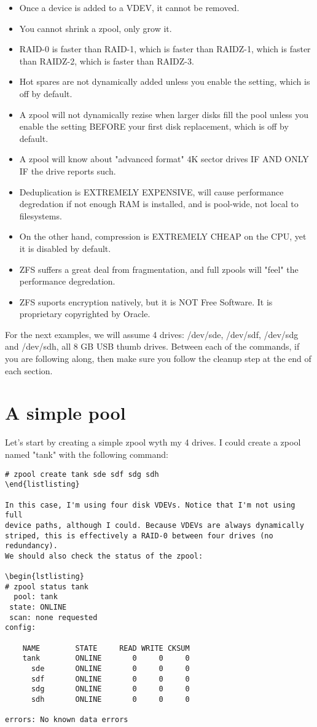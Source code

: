 \documentclass{book}
\begin{document}
\begin{itemize}
\item Once a device is added to a VDEV, it cannot be removed.
\item You cannot shrink a zpool, only grow it.
\item RAID-0 is faster than RAID-1, which is faster than RAIDZ-1, which is
faster than RAIDZ-2, which is faster than RAIDZ-3.
\item Hot spares are not dynamically added unless you enable the setting,
which is off by default.
\item A zpool will not dynamically rezise when larger disks fill the pool
unless you enable the setting BEFORE your first disk replacement, which is
off by default.
\item A zpool will know about "advanced format" 4K sector drives IF AND
ONLY IF the drive reports such.
\item Deduplication is EXTREMELY EXPENSIVE, will cause performance
degredation if not enough RAM is installed, and is pool-wide, not local to
filesystems.
\item On the other hand, compression is EXTREMELY CHEAP on the CPU, yet it
is disabled by default.
\item ZFS suffers a great deal from fragmentation, and full zpools will
"feel" the performance degredation.
\item ZFS suports encryption natively, but it is NOT Free Software. It is
proprietary copyrighted by Oracle.
\end{itemize}

For the next examples, we will assume 4 drives: /dev/sde, /dev/sdf,
/dev/sdg and /dev/sdh, all 8 GB USB thumb drives. Between each of the
commands, if you are following along, then make sure you follow the cleanup
step at the end of each section.

\section{A simple pool}
Let's start by creating a simple zpool wyth my 4 drives. I could create a
zpool named "tank" with the following command:

\begin{lstlisting}
# zpool create tank sde sdf sdg sdh
\end{listlisting}

In this case, I'm using four disk VDEVs. Notice that I'm not using full
device paths, although I could. Because VDEVs are always dynamically
striped, this is effectively a RAID-0 between four drives (no redundancy).
We should also check the status of the zpool:

\begin{lstlisting}
# zpool status tank
  pool: tank
 state: ONLINE
 scan: none requested
config:

    NAME        STATE     READ WRITE CKSUM
    tank        ONLINE       0     0     0
      sde       ONLINE       0     0     0
      sdf       ONLINE       0     0     0
      sdg       ONLINE       0     0     0
      sdh       ONLINE       0     0     0

errors: No known data errors
\end{lstlisting}
\end{document}
